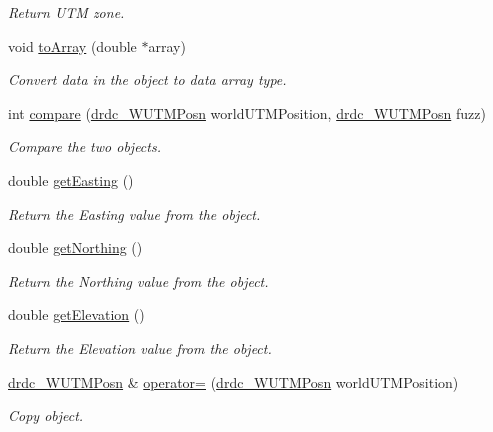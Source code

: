 \begin{CompactItemize}
\begin{CompactList}\small\item\em Return UTM zone. \item\end{CompactList}\item 
void \hyperlink{classdrdc__WUTMPosn_568892ce7a76ddbc19e3d627a977261f}{toArray} (double $\ast$array)
\begin{CompactList}\small\item\em Convert data in the object to data array type. \item\end{CompactList}\item 
int \hyperlink{classdrdc__WUTMPosn_ad6103831648f11947798527a8df34d5}{compare} (\hyperlink{classdrdc__WUTMPosn}{drdc\_\-WUTMPosn} worldUTMPosition, \hyperlink{classdrdc__WUTMPosn}{drdc\_\-WUTMPosn} fuzz)
\begin{CompactList}\small\item\em Compare the two objects. \item\end{CompactList}\item 
double \hyperlink{classdrdc__WUTMPosn_3e4c6d4abbc6efa724733b795826c766}{getEasting} ()
\begin{CompactList}\small\item\em Return the Easting value from the object. \item\end{CompactList}\item 
double \hyperlink{classdrdc__WUTMPosn_d0f500ab444b9cca16e37333b3bf9455}{getNorthing} ()
\begin{CompactList}\small\item\em Return the Northing value from the object. \item\end{CompactList}\item 
double \hyperlink{classdrdc__WUTMPosn_bf685c57793268aba186272c75f69441}{getElevation} ()
\begin{CompactList}\small\item\em Return the Elevation value from the object. \item\end{CompactList}\item 
\hyperlink{classdrdc__WUTMPosn}{drdc\_\-WUTMPosn} \& \hyperlink{classdrdc__WUTMPosn_dd6c29f98f75aacb1c21b29617e0ffbc}{operator=} (\hyperlink{classdrdc__WUTMPosn}{drdc\_\-WUTMPosn} worldUTMPosition)
\begin{CompactList}\small\item\em Copy object. \item\end{CompactList}\item 

\end{CompactItemize}
